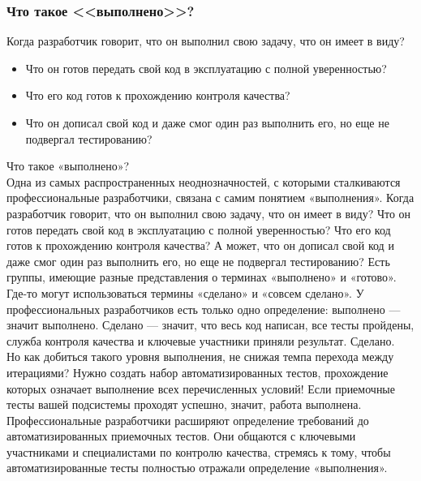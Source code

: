 \documentclass{../industrial-development}
\begin{document}
\begin{frame} \frametitle{Что такое <<выполнено>>?}
Когда разработчик говорит, что он выполнил свою задачу, что он имеет в виду?
\begin{itemize}
  \item Что он готов передать свой код в эксплуатацию с полной уверенностью?
  \item Что его код готов к прохождению контроля качества?
	\item Что он дописал свой код и даже смог один раз выполнить его, но еще не подвергал тестированию?
\end{itemize}
\end{frame}
\lecturenotes
Что такое «выполнено»?\\
Одна из самых распространенных неоднозначностей, с которыми сталкиваются профессиональные разработчики, связана с самим понятием «выполнения». Когда разработчик говорит, что он выполнил свою задачу, что он имеет в виду? Что он готов передать свой код в эксплуатацию с полной уверенностью? Что его код готов к прохождению контроля качества? А может, что он дописал свой код и даже смог один раз выполнить его, но еще не подвергал тестированию?
Есть группы, имеющие разные представления о терминах «выполнено» и «готово». Где-то могут использоваться термины «сделано» и «совсем сделано». У профессиональных разработчиков есть только одно определение: выполнено — значит выполнено. Сделано — значит, что весь код написан, все тесты пройдены, служба контроля качества и ключевые участники приняли результат. Сделано.\\
Но как добиться такого уровня выполнения, не снижая темпа перехода между итерациями? Нужно создать набор автоматизированных тестов, прохождение которых означает выполнение всех перечисленных условий! Если приемочные тесты вашей подсистемы проходят успешно, значит, работа выполнена.\\
Профессиональные разработчики расширяют определение требований до автоматизированных приемочных тестов. Они общаются с ключевыми участниками и специалистами по контролю качества, стремясь к тому, чтобы автоматизированные тесты полностью отражали определение «выполнения».
\end{document}
